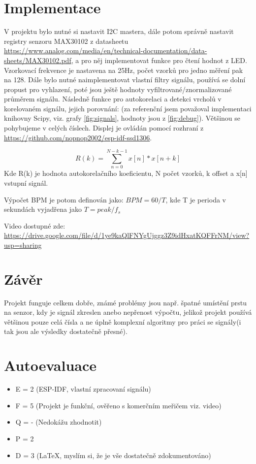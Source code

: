 \documentclass{article}
\begin{document}
\section{Implementace}
V projektu bylo nutné si nastavit I2C mastera, dále potom správně nastavit registry senzoru MAX30102 z datasheetu \url{https://www.analog.com/media/en/technical-documentation/data-sheets/MAX30102.pdf}, a pro něj implementovat funkce pro čtení hodnot z LED. Vzorkovací frekvence je nastavena na 25Hz, počet vzorků pro jedno měření pak na 128. Dále bylo nutné naimplementovat vlastní filtry signálu, používá se dolní propust pro vyhlazení, poté jsou ještě hodnoty vyfiltrované/znormalizované průměrem signálu. Následně funkce pro autokorelaci a detekci vrcholů v korelovaném signálu, jejich porovnání: (za referenční jsem považoval implementaci knihovny Scipy, viz. grafy \ref{fig:signals}, hodnoty jsou z \ref{fig:debug}). Většinou se pohybujeme v celých číslech. Displej je ovládán pomocí rozhraní z \url{https://github.com/nopnop2002/esp-idf-ssd1306}. 

$$
    R(k) = \sum_{n=0}^{N-k-1}x[n]*x[n+k]
$$
Kde R(k) je hodnota autokorelačního koeficientu, N počet vzorků, k offset a x[n] vstupní signál.

Výpočet BPM je potom definován jako: $BPM = 60/T$, kde T je perioda v sekundách vyjadřena jako $ T = peak/f_s $

Video dostupné zde: \url{https://drive.google.com/file/d/1ye9kaQlFNYgUjggz3Z9idHxatKQFFrNM/view?usp=sharing}
\section{Závěr}
Projekt funguje celkem dobře, známé problémy jsou např. špatné umístění prstu na senzor, kdy je signál zkreslen anebo nepřenost výpočtu, jelikož projekt používá většinou pouze celá čísla a ne úplně komplexní algoritmy pro práci se signály(i tak jsou ale výsledky dostatečně přesné). 
\section{Autoevaluace}
\begin{itemize}
    \item E = 2 (ESP-IDF, vlastní zpracovaní signálu)
    \item F = 5 (Projekt je funkční, ověřeno s komerčním meřičem viz. video)
    \item Q = - (Nedokážu zhodnotit)
    \item P = 2 
    \item D = 3 (\LaTeX, myslím si, že je vše dostatečně zdokumentováno)
\end{itemize}
\end{document}
